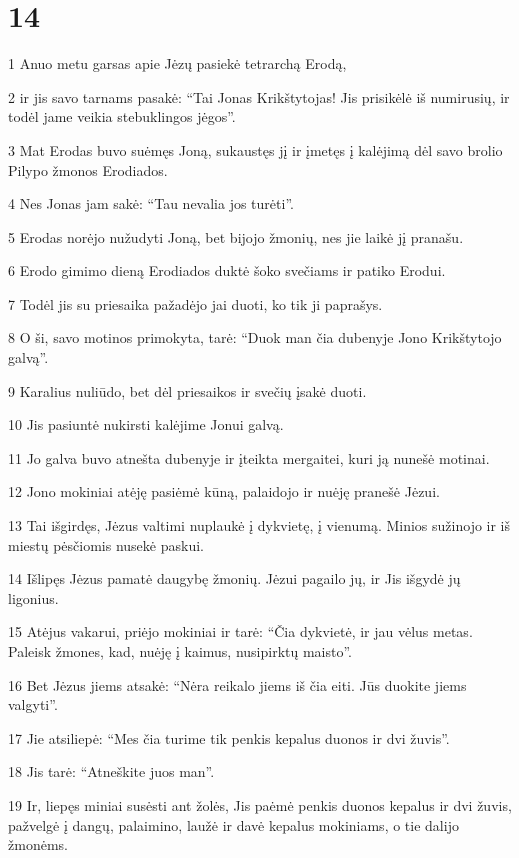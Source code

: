 \chapter{14}


\par 1 Anuo metu garsas apie Jėzų pasiekė tetrarchą Erodą, 
\par 2 ir jis savo tarnams pasakė: “Tai Jonas Krikštytojas! Jis prisikėlė iš numirusių, ir todėl jame veikia stebuklingos jėgos”. 
\par 3 Mat Erodas buvo suėmęs Joną, sukaustęs jį ir įmetęs į kalėjimą dėl savo brolio Pilypo žmonos Erodiados. 
\par 4 Nes Jonas jam sakė: “Tau nevalia jos turėti”. 
\par 5 Erodas norėjo nužudyti Joną, bet bijojo žmonių, nes jie laikė jį pranašu. 
\par 6 Erodo gimimo dieną Erodiados duktė šoko svečiams ir patiko Erodui. 
\par 7 Todėl jis su priesaika pažadėjo jai duoti, ko tik ji paprašys. 
\par 8 O ši, savo motinos primokyta, tarė: “Duok man čia dubenyje Jono Krikštytojo galvą”. 
\par 9 Karalius nuliūdo, bet dėl priesaikos ir svečių įsakė duoti. 
\par 10 Jis pasiuntė nukirsti kalėjime Jonui galvą. 
\par 11 Jo galva buvo atnešta dubenyje ir įteikta mergaitei, kuri ją nunešė motinai. 
\par 12 Jono mokiniai atėję pasiėmė kūną, palaidojo ir nuėję pranešė Jėzui. 
\par 13 Tai išgirdęs, Jėzus valtimi nuplaukė į dykvietę, į vienumą. Minios sužinojo ir iš miestų pėsčiomis nusekė paskui. 
\par 14 Išlipęs Jėzus pamatė daugybę žmonių. Jėzui pagailo jų, ir Jis išgydė jų ligonius. 
\par 15 Atėjus vakarui, priėjo mokiniai ir tarė: “Čia dykvietė, ir jau vėlus metas. Paleisk žmones, kad, nuėję į kaimus, nusipirktų maisto”. 
\par 16 Bet Jėzus jiems atsakė: “Nėra reikalo jiems iš čia eiti. Jūs duokite jiems valgyti”. 
\par 17 Jie atsiliepė: “Mes čia turime tik penkis kepalus duonos ir dvi žuvis”. 
\par 18 Jis tarė: “Atneškite juos man”. 
\par 19 Ir, liepęs miniai susėsti ant žolės, Jis paėmė penkis duonos kepalus ir dvi žuvis, pažvelgė į dangų, palaimino, laužė ir davė kepalus mokiniams, o tie dalijo žmonėms. 
